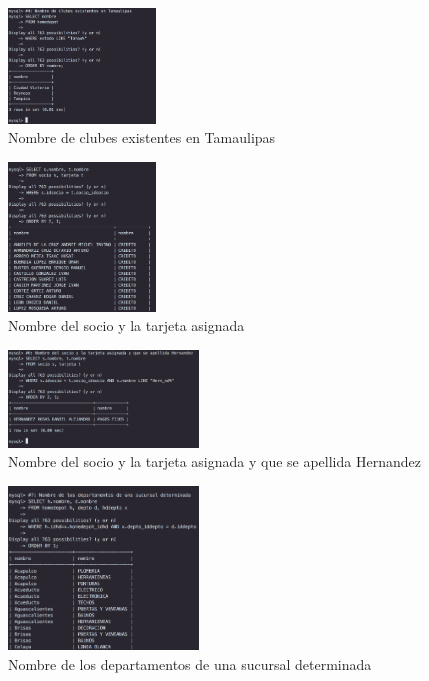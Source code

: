 \documentclass[12pt, fleqn]{article}                             %
\begin{document}
        \begin{figure}[ht!]
            \centering
            \includegraphics[width=0.35\textwidth]{BD3Reporte3}
            \caption{Nombre de clubes existentes en Tamaulipas}
        \end{figure}

        \begin{figure}[ht!]
            \centering
            \includegraphics[width=0.35\textwidth]{BD3Reporte4}
            \caption{Nombre del socio y la tarjeta asignada}
        \end{figure}

        \begin{figure}[ht!]
            \centering
            \includegraphics[width=0.45\textwidth]{BD3Reporte5}
            \caption{Nombre del socio y la tarjeta asignada y que se apellida Hernandez}
        \end{figure}

        \begin{figure}[ht!]
            \centering
            \includegraphics[width=0.45\textwidth]{BD3Reporte6}
            \caption{Nombre de los departamentos de una sucursal determinada}
        \end{figure}
\end{document}
